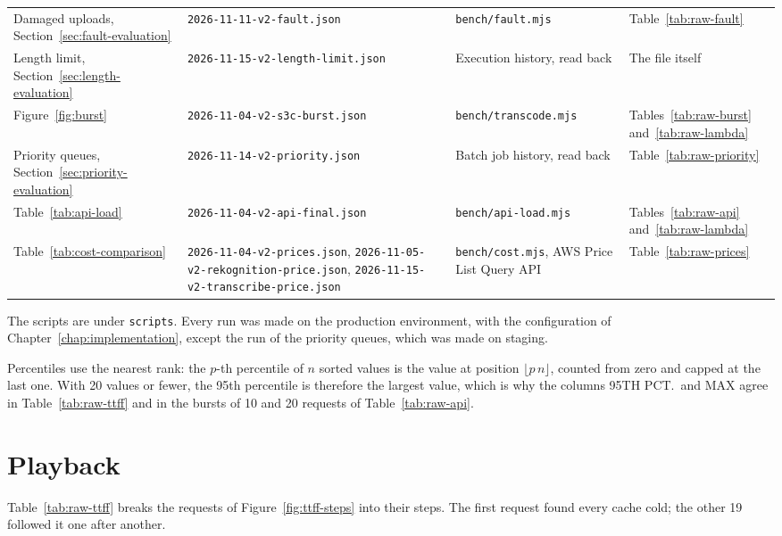 \begin{table}[H]
\begin{tabularx}{\textwidth}{>{\raggedright\arraybackslash}X >{\raggedright\arraybackslash}p{} >{\raggedright\arraybackslash}p{} >{\raggedright\arraybackslash}p{}}
Damaged uploads, Section~\ref{sec:fault-evaluation} & \texttt{2026-11-11-v2-fault.json} & \texttt{bench/fault.mjs} & Table~\ref{tab:raw-fault} \\
Length limit, Section~\ref{sec:length-evaluation} & \texttt{2026-11-15-v2-length-limit.json} & Execution history, read back & The file itself \\
Figure~\ref{fig:burst} & \texttt{2026-11-04-v2-s3c-burst.json} & \texttt{bench/transcode.mjs} & Tables~\ref{tab:raw-burst} and~\ref{tab:raw-lambda} \\
Priority queues, Section~\ref{sec:priority-evaluation} & \texttt{2026-11-14-v2-priority.json} & Batch job history, read back & Table~\ref{tab:raw-priority} \\
Table~\ref{tab:api-load} & \texttt{2026-11-04-v2-api-final.json} & \texttt{bench/api-load.mjs} & Tables~\ref{tab:raw-api} and~\ref{tab:raw-lambda} \\
Table~\ref{tab:cost-comparison} & \texttt{2026-11-04-v2-prices.json}, \texttt{2026-11-05-v2-rekognition-price.json}, \texttt{2026-11-15-v2-transcribe-price.json} & \texttt{bench/cost.mjs}, AWS Price List Query API & Table~\ref{tab:raw-prices} \\
\bottomrule
\end{tabularx}
\end{table}

The scripts are under \mbox{\texttt{scripts}}. Every run was made on the production environment,
with the configuration of Chapter~\ref{chap:implementation}, except the run of the priority queues,
which was made on staging.

Percentiles use the nearest rank: the $p$-th percentile of $n$ sorted values is the value at position
$\lfloor p\,n \rfloor$, counted from zero and capped at the last one. With 20 values or fewer, the
95th percentile is therefore the largest value, which is why the columns 95TH PCT.\ and MAX agree in
Table~\ref{tab:raw-ttff} and in the bursts of 10 and 20 requests of Table~\ref{tab:raw-api}.

\section{Playback}

Table~\ref{tab:raw-ttff} breaks the requests of Figure~\ref{fig:ttff-steps} into their steps. The
first request found every cache cold; the other 19 followed it one after another.



